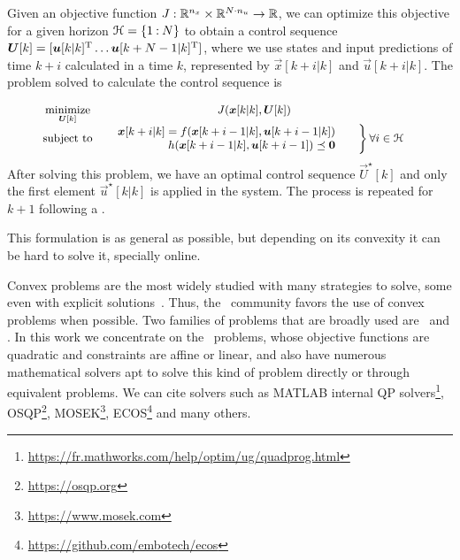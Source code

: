 \documentclass[../main.tex]{subfiles}
\begin{document}
Given an objective function $J:\mathbb{R}^{n_{x}}\times\mathbb{R}^{N\cdot n_{u}}\to \mathbb{R}$, we can optimize this objective for a given horizon $\mathcal{H}=\{1\mathbin{:}N\}$ to obtain a control sequence $\boldsymbol{U}[k]=[\boldsymbol{u}[k|k]^{\mathrm{T}} \dots \boldsymbol{u}[k+N-1|k]^{\mathrm{T}}]$, where
we use states and input predictions of time $k+i$ calculated in a time $k$, represented by $\vec{x}[k+i|k]$ and $\vec{u}[k+i|k]$. The problem solved to calculate the control sequence is

\begin{equation}\label{eq:general_mpc}
  \small
  \begin{aligned}
    \begin{matrix}
      \underset{\boldsymbol{U}[k]}{\mathrm{minimize}} & J(\boldsymbol{x}[k|k],\boldsymbol{U}[k])&\\
      \mathrm{subject~ to} &

      \left.  \begin{aligned}
          \quad \boldsymbol{x}[k+i|k]=f(\boldsymbol{x}[k+i-1|k],\boldsymbol{u}[k+i-1|k])\\
          \quad                h(\boldsymbol{x}[k+i-1|k],\boldsymbol{u}[k+i-1])\preceq\mathbf{0}
        \end{aligned}\qquad        \right\}

      \begin{aligned}
        \forall i\in\mathcal{H}
      \end{aligned}
    \end{matrix}
  \end{aligned}
\end{equation}
After solving this problem, we have an optimal control sequence $\vec{U}^{\star}[k]$ and only the first element $\vec{u}^{\star}[k|k]$ is applied in the system. The process is repeated for $k+1$ following a \rhs.

This formulation is as general as possible, but depending on its convexity it can be hard to solve it, specially online.

Convex problems are the most widely studied with many strategies to solve, some even with explicit solutions~\cite{BoydVandenberghe2004}. Thus, the \mpc\ community favors the use of convex problems when possible. Two families of problems that are broadly used are \qp\ and \lp.
In this work we concentrate on the \qp\ problems, whose objective functions are quadratic and constraints are affine or linear, and also have numerous mathematical solvers apt to solve this kind of problem directly or through equivalent problems. We can cite solvers such as MATLAB internal QP solvers\footnote{\url{https://fr.mathworks.com/help/optim/ug/quadprog.html}}, OSQP\footnote{\url{https://osqp.org}}, MOSEK\footnote{\url{https://www.mosek.com}}, ECOS\footnote{\url{https://github.com/embotech/ecos}} and many others.
\end{document}
